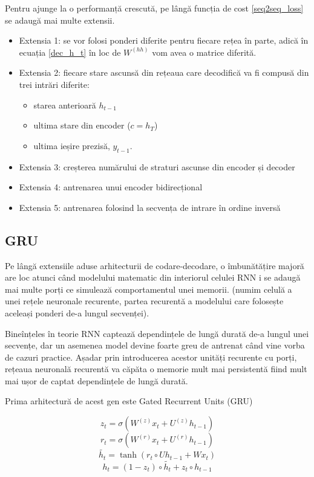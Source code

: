 Pentru ajunge la o performanță crescută, pe lângă funcția de cost \ref{seq2seq_loss} se adaugă mai multe extensii.
\begin{itemize}
	\item Extensia 1: se vor folosi ponderi diferite pentru fiecare rețea în parte, adică în ecuația \ref{dec_h_t} în loc de $W^{(hh)}$ vom avea o matrice diferită.
	\item Extensia 2: fiecare stare ascunsă din rețeaua care decodifică va fi compusă din trei intrări diferite:
	\begin{itemize}
		\item starea anterioară $h_{t-1}$
		\item ultima stare din encoder ($c=h_T$)
		\item ultima ieșire prezisă, $y_{t-1}$.
	\end{itemize}
	\item Extensia 3: creșterea numărului de straturi ascunse din encoder și decoder
	\item Extensia 4: antrenarea unui encoder bidirecțional
	\item Extensia 5: antrenarea folosind la secvența de intrare în ordine inversă
\end{itemize}


\subsection{GRU}

Pe lângă extensiile aduse arhitecturii de codare-decodare, o îmbunătățire majoră are loc atunci când modelului matematic din interiorul celulei RNN i se adaugă mai multe porți ce simulează comportamentul unei memorii. (numim celulă a unei rețele neuronale recurente, partea recurentă a modelului care folosește aceleași ponderi de-a lungul secvenței).

Bineînțeles în teorie RNN captează dependințele de lungă durată de-a lungul unei secvențe, dar un asemenea model devine foarte greu de antrenat când vine vorba de cazuri practice. Așadar prin introducerea acestor unități recurente cu porți, rețeaua neuronală recurentă va căpăta o memorie mult mai persistentă fiind mult mai ușor de captat dependințele de lungă durată.

Prima arhitectură de acest gen este Gated Recurrent Units (GRU)

\begin{equation}
	z_t = \sigma(W^{(z)} x_t + U^{(z)} h_{t-1})
	\label{update_gate}
\end{equation}
\begin{equation}
	r_t = \sigma(W^{(r)} x_t + U^{(r)} h_{t-1})
	\label{reset_gate}
\end{equation}
\begin{equation}
	\widetilde{h_t} = \tanh(r_t \circ U h_{t-1} + W x_t)
	\label{new_memory}
\end{equation}
\begin{equation}
	h_t = (1-z_t) \circ \widetilde{h_t} + z_t \circ h_{t-1}
\end{equation}

